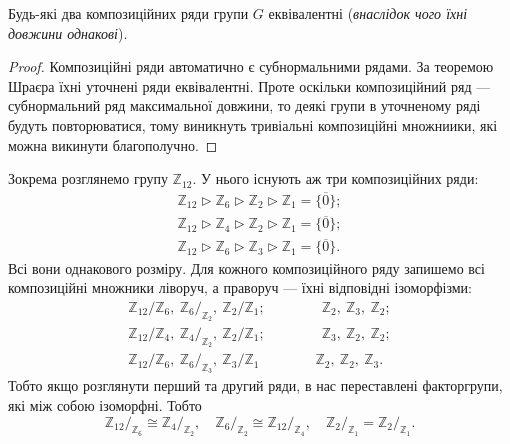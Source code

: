 \documentclass{math_library}
\begin{document}
\begin{theorem}
Будь-які два композиційних ряди групи $G$ еквівалентні (\textit{внаслідок чого їхні довжини однакові}).
\end{theorem}

\begin{proof}
Композиційні ряди автоматично є субнормальними рядами. За теоремою Шраєра їхні уточнені ряди еквівалентні. Проте оскільки композиційний ряд --- субнормальний ряд максимальної довжини, то деякі групи в уточненому ряді будуть повторюватися, тому виникнуть тривіальні композиційні множниики, які можна викинути благополучно.
\end{proof}

\begin{example}
Зокрема розглянемо групу $\mathbb{Z}_{12}$. У нього існують аж три композиційних ряди:
\begin{align*}
\mathbb{Z}_{12} \triangleright \mathbb{Z}_6 \triangleright \mathbb{Z}_2 \triangleright \mathbb{Z}_1 = \{\overline{0}\}; \\
\mathbb{Z}_{12} \triangleright \mathbb{Z}_4 \triangleright \mathbb{Z}_2 \triangleright \mathbb{Z}_1 = \{\overline{0}\}; \\
\mathbb{Z}_{12} \triangleright \mathbb{Z}_6 \triangleright \mathbb{Z}_3 \triangleright \mathbb{Z}_1 = \{\overline{0}\}.
\end{align*}
Всі вони однакового розміру. Для кожного композиційного ряду запишемо всі композиційні множники ліворуч, а праворуч --- їхні  відповідні ізоморфізми:
\begin{align*}
{\mathbb{Z}_{12}}/{\mathbb{Z}_6},\ {\mathbb{Z}_6}/_{\mathbb{Z}_2},\ {\mathbb{Z}_2}/{\mathbb{Z}_1}; \qquad\qquad \mathbb{Z}_2,\ \mathbb{Z}_3,\ \mathbb{Z}_2;\\
{\mathbb{Z}_{12}}/{\mathbb{Z}_4},\ {\mathbb{Z}_4}/_{\mathbb{Z}_2},\ {\mathbb{Z}_2}/{\mathbb{Z}_1}; \qquad\qquad \mathbb{Z}_3,\ \mathbb{Z}_2,\ \mathbb{Z}_2;\\
{\mathbb{Z}_{12}}/{\mathbb{Z}_6},\ {\mathbb{Z}_6}/_{\mathbb{Z}_3},\ {\mathbb{Z}_3}/{\mathbb{Z}_1} \qquad\qquad \mathbb{Z}_2,\ \mathbb{Z}_2,\ \mathbb{Z}_3.
\end{align*}
Тобто якщо розглянути перший та другий ряди, в нас переставлені факторгрупи, які між собою ізоморфні. Тобто 
\[
{\mathbb{Z}_{12}}/_{\mathbb{Z}_6} \cong {\mathbb{Z}_{4}}/_{\mathbb{Z}_2},\quad {\mathbb{Z}_{6}}/_{\mathbb{Z}_2} \cong {\mathbb{Z}_{12}}/_{\mathbb{Z}_4},\quad {\mathbb{Z}_{2}}/_{\mathbb{Z}_1} = {\mathbb{Z}_{2}}/_{\mathbb{Z}_1}.
\]
\end{example}
\end{document}

